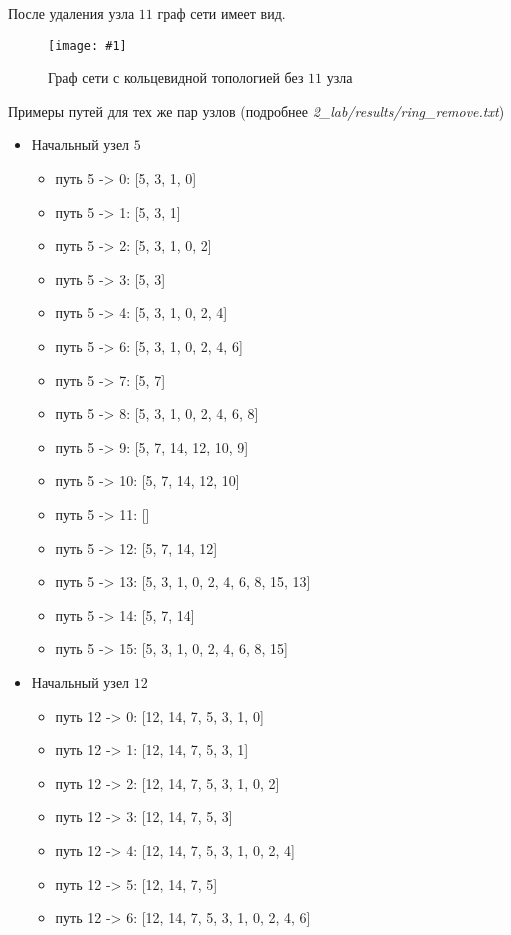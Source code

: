 \documentclass[a4paper,12pt]{article}
\newcommand{\plot}[3]{
    \begin{figure}[H]
        \begin{center}
            \texttt{[image: \#1]}
            \caption{#2}
            \label{#3}
        \end{center}
    \end{figure}
}
\begin{document}
    После удаления узла $ 11 $ граф сети имеет вид.
    \plot{rm_ring}{Граф сети с кольцевидной топологией без $ 11 $ узла}{p:rmRing}

    Примеры путей для тех же пар узлов (подробнее \textsl{2\_lab/results/ring\_remove.txt})
    \begin{itemize}
        \item Начальный узел $ 5 $
        \begin{itemize}
            \item путь 5 -> 0: [5, 3, 1, 0]
            \item путь 5 -> 1: [5, 3, 1]
            \item путь 5 -> 2: [5, 3, 1, 0, 2]
            \item путь 5 -> 3: [5, 3]
            \item путь 5 -> 4: [5, 3, 1, 0, 2, 4]
            \item путь 5 -> 6: [5, 3, 1, 0, 2, 4, 6]
            \item путь 5 -> 7: [5, 7]
            \item путь 5 -> 8: [5, 3, 1, 0, 2, 4, 6, 8]
            \item путь 5 -> 9: [5, 7, 14, 12, 10, 9]
            \item путь 5 -> 10: [5, 7, 14, 12, 10]
            \item путь 5 -> 11: []
            \item путь 5 -> 12: [5, 7, 14, 12]
            \item путь 5 -> 13: [5, 3, 1, 0, 2, 4, 6, 8, 15, 13]
            \item путь 5 -> 14: [5, 7, 14]
            \item путь 5 -> 15: [5, 3, 1, 0, 2, 4, 6, 8, 15]
        \end{itemize}
        \item Начальный узел $ 12 $
        \begin{itemize}
            \item путь 12 -> 0: [12, 14, 7, 5, 3, 1, 0]
            \item путь 12 -> 1: [12, 14, 7, 5, 3, 1]
            \item путь 12 -> 2: [12, 14, 7, 5, 3, 1, 0, 2]
            \item путь 12 -> 3: [12, 14, 7, 5, 3]
            \item путь 12 -> 4: [12, 14, 7, 5, 3, 1, 0, 2, 4]
            \item путь 12 -> 5: [12, 14, 7, 5]
            \item путь 12 -> 6: [12, 14, 7, 5, 3, 1, 0, 2, 4, 6]

\end{itemize}
\end{itemize}
\end{document}
